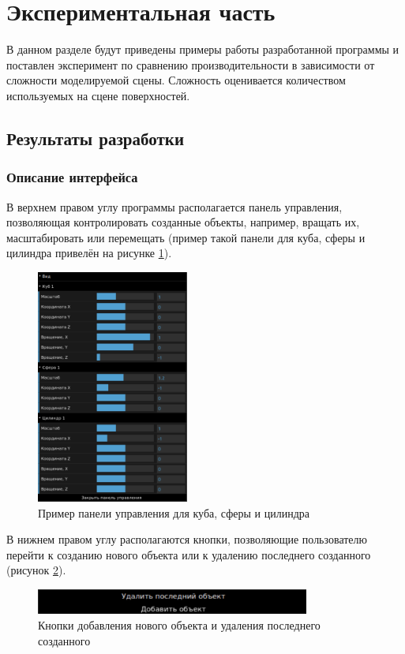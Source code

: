 \section{Экспериментальная часть}
\label{cha:research}

В данном разделе будут приведены примеры работы разработанной программы и поставлен эксперимент по сравнению производительности
в зависимости от сложности моделируемой сцены. Сложность оценивается количеством используемых на сцене поверхностей.

\subsection{Результаты разработки}

\subsubsection{Описание интерфейса}

В верхнем правом углу программы располагается панель управления, позволяющая контролировать созданные объекты, например, вращать их, масштабировать или перемещать (пример такой панели для куба, сферы и цилиндра привелён на рисунке \ref{fig:panel}). 
\begin{figure}[h]
	\centering
	\captionsetup{justification=centering}
	\includegraphics[width=50mm]{img/panel.png}
	\caption{Пример панели управления для куба, сферы и цилиндра}
	\label{fig:panel}
\end{figure}

В нижнем правом углу располагаются кнопки, позволяющие пользователю перейти к созданию нового объекта или к удалению последнего созданного (рисунок \ref{fig:add-buttons}).
\begin{figure}[h]
	\centering
	\captionsetup{justification=centering}
	\includegraphics[width=90mm]{img/add-buttons.png}
	\caption{Кнопки добавления нового объекта и удаления последнего созданного}
	\label{fig:add-buttons}
\end{figure}


